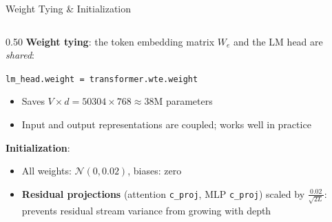 \begin{frame}{Weight Tying \& Initialization}

  \begin{columns}
    \begin{column}{0.50\textwidth}
      \textbf{Weight tying}: the token embedding matrix $W_e$ and the LM head are \emph{shared}:
      \begin{center}
        \texttt{lm\_head.weight = transformer.wte.weight}
      \end{center}
      \begin{itemize}
        \item Saves $V \times d = 50304 \times 768 \approx 38$M parameters
        \item Input and output representations are coupled; works well in practice
      \end{itemize}

      \vspace{0.4em}
      \textbf{Initialization}:
      \begin{itemize}
        \item All weights: $\mathcal{N}(0, 0.02)$, biases: zero
        \item \textbf{Residual projections} (attention \texttt{c\_proj}, MLP \texttt{c\_proj}) scaled by $\frac{0.02}{\sqrt{2L}}$: prevents residual stream variance from growing with depth
      \end{itemize}


\end{column}
\end{columns}
\end{frame}
